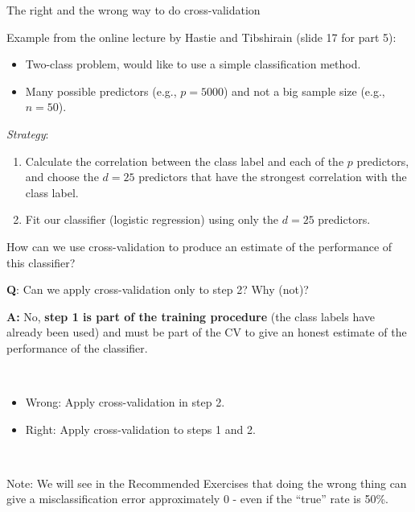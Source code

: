 \documentclass[
  10pt,
  ignorenonframetext,
]{beamer}
\providecommand{\tightlist}{%
  \setlength{\itemsep}{0pt}\setlength{\parskip}{0pt}}
\begin{document}
\begin{frame}
\begin{block}{The right and the wrong way to do cross-validation}
\protect\hypertarget{the-right-and-the-wrong-way-to-do-cross-validation}{}
\(~\)

Example from the online lecture by Hastie and Tibshirain (slide 17 for
part 5):

\vspace{2mm}

\begin{itemize}
\tightlist
\item
  Two-class problem, would like to use a simple classification method.
\item
  Many possible predictors (e.g., \(p=5000\)) and not a big sample size
  (e.g., \(n=50\)).
\end{itemize}

\vspace{2mm}

\emph{Strategy}:

\begin{enumerate}
\item
  Calculate the correlation between the class label and each of the
  \(p\) predictors, and choose the \(d=25\) predictors that have the
  strongest correlation with the class label.
\item
  Fit our classifier (logistic regression) using only the \(d=25\)
  predictors.
\end{enumerate}

\vspace{2mm}

How can we use cross-validation to produce an estimate of the
performance of this classifier?
\end{block}
\end{frame}

\begin{frame}
\textbf{Q}: Can we apply cross-validation only to step 2? Why (not)?

\textbf{A:} No, \textbf{step 1 is part of the training procedure} (the
class labels have already been used) and must be part of the CV to give
an honest estimate of the performance of the classifier.

\(~\)

\begin{itemize}
\tightlist
\item
  Wrong: Apply cross-validation in step 2.
\item
  Right: Apply cross-validation to steps 1 and 2.
\end{itemize}

\(~\)

Note: We will see in the Recommended Exercises that doing the wrong
thing can give a misclassification error approximately 0 - even if the
``true'' rate is 50\%.
\end{frame}
\end{document}
